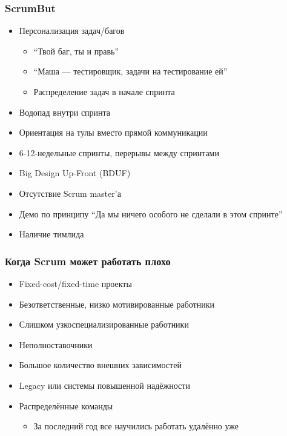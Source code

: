 \documentclass[xetex,mathserif,serif]{beamer}
\begin{document}
    \begin{frame}
        \frametitle{ScrumBut}
        \begin{itemize}
            \item Персонализация задач/багов
            \begin{itemize}
                \item ``Твой баг, ты и правь''
                \item ``Маша --- тестировщик, задачи на тестирование ей''
                \item Распределение задач в начале спринта
            \end{itemize}
            \item Водопад внутри спринта
            \item Ориентация на тулы вместо прямой коммуникации
            \item 6-12-недельные спринты, перерывы между спринтами
            \item Big Design Up-Front (BDUF)
            \item Отсутствие Scrum master’а
            \item Демо по принципу ``Да мы ничего особого не сделали в этом спринте''
            \item Наличие тимлида
        \end{itemize}
    \end{frame}

    \begin{frame}
        \frametitle{Когда Scrum может работать плохо}
        \begin{itemize}
            \item Fixed-cost/fixed-time проекты
            \item Безответственные, низко мотивированные работники
            \item Слишком узкоспециализированные работники
            \item Неполноставочники
            \item Большое количество внешних зависимостей
            \item Legacy или системы повышенной надёжности
            \item Распределённые команды 
            \begin{itemize}
                \item За последний год все научились работать удалённо уже
            \end{itemize}
        \end{itemize}
    \end{frame}
\end{document}
